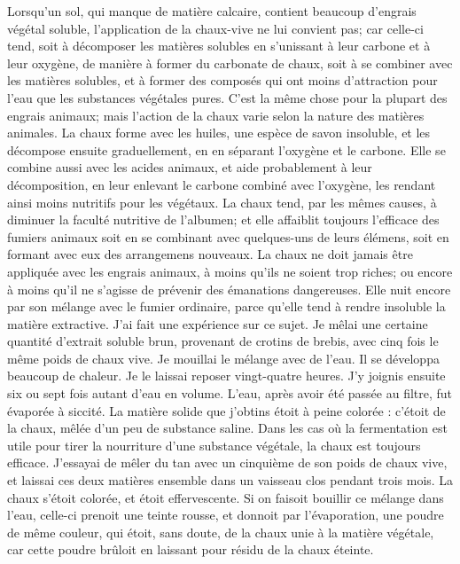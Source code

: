 Lorsqu'un sol, qui manque de matière calcaire, contient beaucoup d'engrais végétal soluble, l'application de la chaux-vive ne lui convient pas; car celle-ci tend, soit à décomposer les matières solubles en s'unissant à leur carbone et à leur oxygène, de manière à former du carbonate de chaux, soit à se combiner avec les matières solubles,\setcounter{page}{222} et à former des composés qui ont moins d'attraction pour l'eau que les substances végétales pures. C'est la même chose pour la plupart des engrais animaux; mais l'action de la chaux varie selon la nature des matières animales. La chaux forme avec les huiles, une espèce de savon insoluble, et les décompose ensuite graduellement, en en séparant l'oxygène et le carbone. Elle se combine aussi avec les acides animaux, et aide probablement à leur décomposition, en leur enlevant le carbone combiné avec l'oxygène, les rendant ainsi moins nutritifs pour les végétaux. La chaux tend, par les mêmes causes, à diminuer la faculté nutritive de l'albumen; et elle affaiblit toujours l'efficace des fumiers animaux soit en se combinant avec quelques-uns de leurs élémens, soit en formant avec eux des arrangemens nouveaux. La chaux ne doit jamais être appliquée avec les engrais animaux, à moins qu'ils ne soient trop riches; ou encore à moins qu'il ne s'agisse de prévenir des émanations dangereuses. Elle nuit encore par son mélange avec le fumier ordinaire, parce qu'elle tend à rendre insoluble la matière extractive. J'ai fait une expérience sur ce sujet. Je\setcounter{page}{223} mêlai une certaine quantité d'extrait soluble brun, provenant de crotins de brebis, avec cinq fois le même poids de chaux vive. Je mouillai le mélange avec de l'eau. Il se développa beaucoup de chaleur. Je le laissai reposer vingt-quatre heures. J'y joignis ensuite six ou sept fois autant d'eau en volume. L'eau, après avoir été passée au filtre, fut évaporée à siccité. La matière solide que j'obtins étoit à peine colorée : c'étoit de la chaux, mêlée d'un peu de substance saline.
Dans les cas où la fermentation est utile pour tirer la nourriture d'une substance végétale, la chaux est toujours efficace. J'essayai de mêler du tan avec un cinquième de son poids de chaux vive, et laissai ces deux matières ensemble dans un vaisseau clos pendant trois mois. La chaux s'étoit colorée, et étoit effervescente. Si on faisoit bouillir ce mélange dans l'eau, celle-ci prenoit une teinte rousse, et donnoit par l'évaporation, une poudre de même couleur, qui étoit, sans doute, de la chaux unie à la matière végétale, car cette poudre brûloit en laissant pour résidu de la chaux éteinte.
